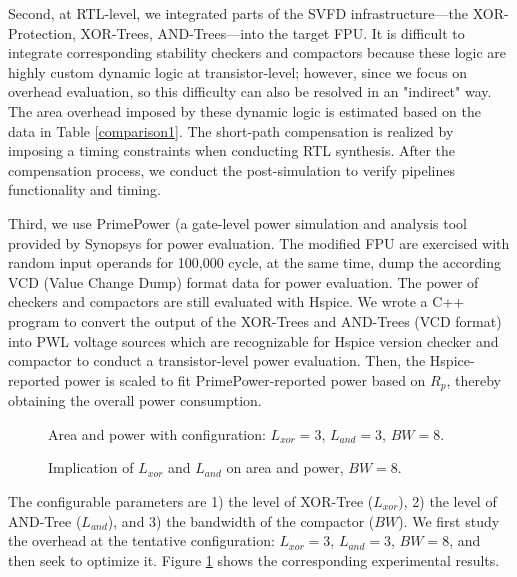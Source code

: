 Second, at RTL-level, we integrated parts of the SVFD infrastructure---the XOR-Protection, XOR-Trees, AND-Trees---into the target FPU. It is difficult to integrate corresponding stability checkers and compactors because these logic are highly custom dynamic logic at transistor-level; however, since we focus on overhead evaluation, so this difficulty can also be resolved in an "indirect" way. The area overhead imposed by these dynamic logic is estimated based on the data in Table \ref{comparison1}. The short-path compensation is realized by imposing a timing constraints when conducting RTL synthesis. After the compensation process, we conduct the post-simulation to verify pipelines functionality and timing.

Third, we use PrimePower (a gate-level power simulation and analysis tool provided by Synopsys for power evaluation. The modified FPU are exercised with random input operands for 100,000 cycle, at the same time, dump the according VCD (Value Change Dump) format data for power evaluation. The power of checkers and compactors are still evaluated with Hspice. We wrote a C++ program to convert the output of the XOR-Trees and AND-Trees (VCD format) into PWL voltage sources which are recognizable for Hspice version checker and compactor to conduct a transistor-level power evaluation. Then, the Hspice-reported power is scaled to fit PrimePower-reported power based on $R_p$, thereby obtaining the overall power consumption.

\begin{figure}
\centering 
{} 
\caption{Area and power with configuration: $L_{xor}=3$, $L_{and}=3$, $BW=8$.} \label{area_power}
\end{figure}

\begin{figure}
\centering {}   \caption{Implication of
$L_{xor}$ and $L_{and}$ on area and power, $BW=8$.} \label{lxor_land}
\end{figure}

\vspace{0.3cm}
The configurable parameters are 1) the level of XOR-Tree ($L_{xor}$), 2) the level of AND-Tree ($L_{and}$), and 3) the bandwidth of the compactor ($BW$). We first study the overhead at the tentative configuration: $L_{xor}=3$, $L_{and}=3$, $BW=8$, and then seek to optimize it. Figure \ref{area_power} shows the corresponding experimental results.

